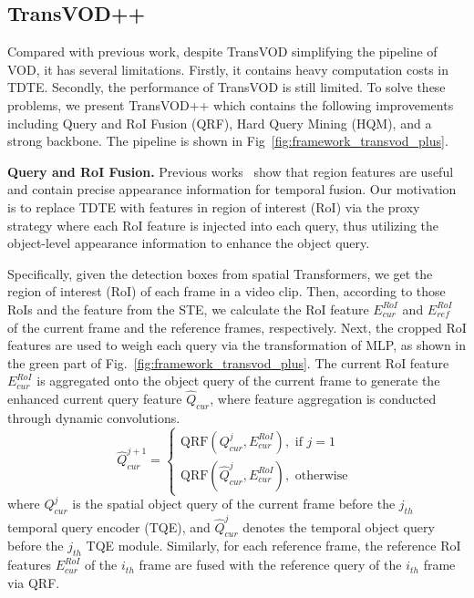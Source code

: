 \documentclass[10pt,journal,compsoc]{IEEEtran}
\begin{document}
\vspace{-4mm}
\subsection{TransVOD++}
\label{sec:TransVOD++}
Compared with previous work, despite TransVOD simplifying the pipeline of VOD, it has several limitations. Firstly, it contains heavy computation costs in TDTE. Secondly, the performance of TransVOD is still limited. To solve these problems, we present TransVOD++ which contains the following improvements including Query and RoI Fusion (QRF), Hard Query Mining (HQM), and a strong backbone. The pipeline is shown in Fig~\ref{fig:framework_transvod_plus}.

\noindent
\textbf{Query and RoI Fusion.} Previous works~\cite{chen2020memory,hu18relationnet} show that region features are useful and contain precise appearance information for temporal fusion. Our motivation is to replace TDTE with features in region of interest (RoI) via the proxy strategy where each RoI feature is injected into each query, thus utilizing the object-level appearance information to enhance the object query.


Specifically, given the detection boxes from spatial Transformers, we get the region of interest (RoI) of each frame in a video clip. Then, according to those RoIs and the feature from the STE, we calculate the RoI feature $E^{RoI}_{cur}$ and $E^{RoI}_{ref}$ of the current frame and the reference frames, respectively. Next, the cropped RoI features are used to weigh each query via the transformation of MLP, as shown in the green part of Fig.~\ref{fig:framework_transvod_plus}.
The current RoI feature $E^{RoI}_{cur}$ is aggregated onto the object query of the current frame to generate the enhanced current query feature $\hat{Q}_{cur}$, where feature aggregation is conducted through dynamic convolutions.  
\begin{equation}
\hat{Q}^{j+1}_{cur} =\left\{\begin{array}{l}
\text{QRF}(Q^{j}_{cur}, E^{RoI}_{cur}), \text { if } j=1  \\
\text{QRF}(\hat{Q}^{j}_{cur}, E^{RoI}_{cur}), \text { otherwise }
\end{array}\right.
\end{equation}
where $Q^{j}_{cur}$ is the spatial object query of the current frame before the $j_{th}$ temporal query encoder (TQE), and $\hat{Q}^{j}_{cur}$ denotes the temporal object query before the $j_{th}$ TQE module.
Similarly, for each reference frame, the reference RoI features $E^{RoI}_{cur}$ of the $i_{th}$ frame are fused with the reference query of the $i_{th}$ frame via QRF. 
\end{document}
